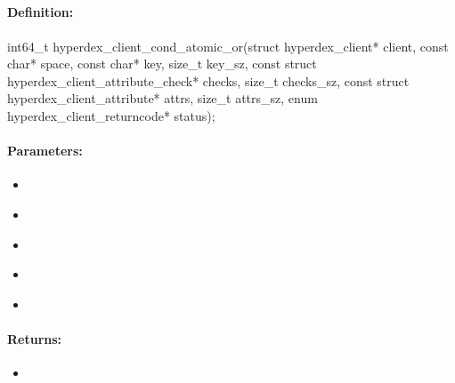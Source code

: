 \pagebreak
\subsection{}
\label{api:c:cond_atomic_or}


\paragraph{Definition:}
\begin{ccode}
int64_t hyperdex_client_cond_atomic_or(struct hyperdex_client* client,
        const char* space,
        const char* key, size_t key_sz,
        const struct hyperdex_client_attribute_check* checks, size_t checks_sz,
        const struct hyperdex_client_attribute* attrs, size_t attrs_sz,
        enum hyperdex_client_returncode* status);
\end{ccode}

\paragraph{Parameters:}
\begin{itemize}[noitemsep]
\item {}\\

\item {}\\

\item {}\\

\item {}\\

\item {}\\

\end{itemize}

\paragraph{Returns:}
\begin{itemize}[noitemsep]
\item {}\\

\end{itemize}

